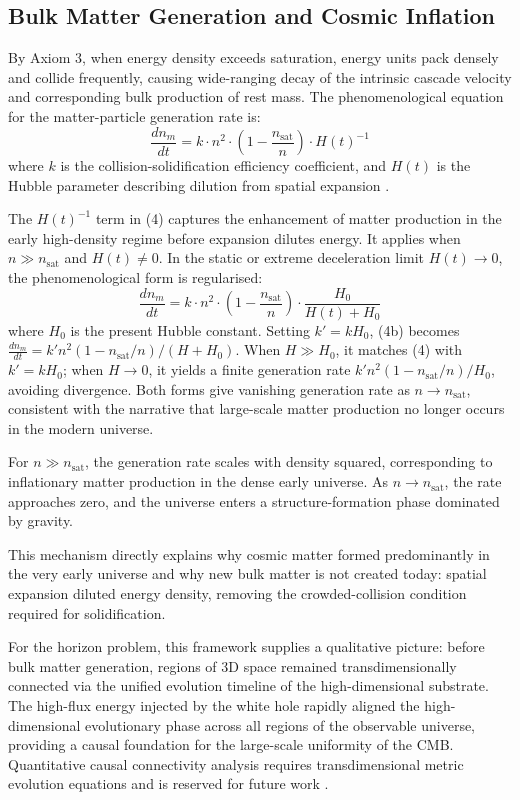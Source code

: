 \documentclass[12pt,a4paper]{article}
\begin{document}
\subsection{Bulk Matter Generation and Cosmic Inflation}
By Axiom 3, when energy density exceeds saturation, energy units pack densely and collide frequently, causing wide-ranging decay of the intrinsic cascade velocity and corresponding bulk production of rest mass. The phenomenological equation for the matter-particle generation rate is:
\begin{equation}
\frac{dn_m}{dt} = k \cdot n^2 \cdot \left( 1 - \frac{n_{\text{sat}}}{n} \right) \cdot H(t)^{-1}
\end{equation}
where $k$ is the collision-solidification efficiency coefficient, and $H(t)$ is the Hubble parameter describing dilution from spatial expansion \cite{friedmann1922, hubble1929}.

The $H(t)^{-1}$ term in (4) captures the enhancement of matter production in the early high-density regime before expansion dilutes energy. It applies when $n \gg n_{\text{sat}}$ and $H(t)\neq 0$. In the static or extreme deceleration limit $H(t)\to 0$, the phenomenological form is regularised:
\begin{equation*}
\frac{dn_m}{dt} = k \cdot n^2 \cdot \left( 1 - \frac{n_{\text{sat}}}{n} \right) \cdot \frac{H_0}{H(t) + H_0} \tag{4b}
\end{equation*}
where $H_0$ is the present Hubble constant. Setting $k'=k H_0$, (4b) becomes $\frac{dn_m}{dt} = k' n^2 (1-n_{\text{sat}}/n)/(H+H_0)$. When $H \gg H_0$, it matches (4) with $k'=kH_0$; when $H\to 0$, it yields a finite generation rate $k' n^2 (1-n_{\text{sat}}/n)/H_0$, avoiding divergence. Both forms give vanishing generation rate as $n\to n_{\text{sat}}$, consistent with the narrative that large-scale matter production no longer occurs in the modern universe.

For $n \gg n_{\text{sat}}$, the generation rate scales with density squared, corresponding to inflationary matter production in the dense early universe. As $n \to n_{\text{sat}}$, the rate approaches zero, and the universe enters a structure-formation phase dominated by gravity.

This mechanism directly explains why cosmic matter formed predominantly in the very early universe and why new bulk matter is not created today: spatial expansion diluted energy density, removing the crowded-collision condition required for solidification.

For the horizon problem, this framework supplies a qualitative picture: before bulk matter generation, regions of 3D space remained transdimensionally connected via the unified evolution timeline of the high-dimensional substrate. The high-flux energy injected by the white hole rapidly aligned the high-dimensional evolutionary phase across all regions of the observable universe, providing a causal foundation for the large-scale uniformity of the CMB. Quantitative causal connectivity analysis requires transdimensional metric evolution equations and is reserved for future work \cite{guth1981, linde1982}.
\end{document}
